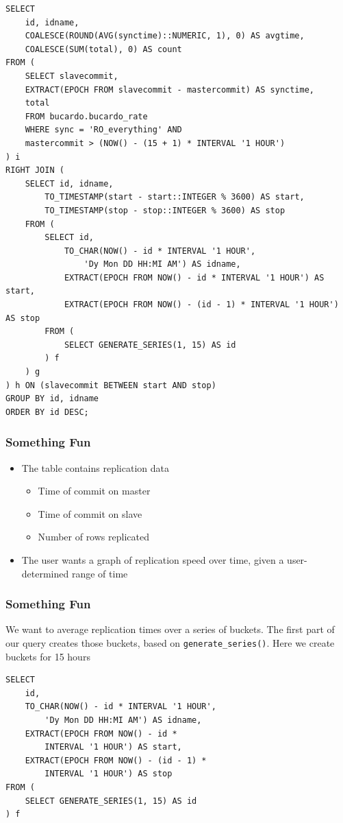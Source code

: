 \documentclass{beamer}
\begin{document}
\begin{frame}[fragile]
    \tiny
    \begin{verbatim}
SELECT
    id, idname,
    COALESCE(ROUND(AVG(synctime)::NUMERIC, 1), 0) AS avgtime,
    COALESCE(SUM(total), 0) AS count
FROM (
    SELECT slavecommit,
    EXTRACT(EPOCH FROM slavecommit - mastercommit) AS synctime,
    total
    FROM bucardo.bucardo_rate
    WHERE sync = 'RO_everything' AND
    mastercommit > (NOW() - (15 + 1) * INTERVAL '1 HOUR')
) i
RIGHT JOIN (
    SELECT id, idname,
        TO_TIMESTAMP(start - start::INTEGER % 3600) AS start,
        TO_TIMESTAMP(stop - stop::INTEGER % 3600) AS stop
    FROM (
        SELECT id,
            TO_CHAR(NOW() - id * INTERVAL '1 HOUR', 
                'Dy Mon DD HH:MI AM') AS idname,
            EXTRACT(EPOCH FROM NOW() - id * INTERVAL '1 HOUR') AS start,
            EXTRACT(EPOCH FROM NOW() - (id - 1) * INTERVAL '1 HOUR') AS stop
        FROM (
            SELECT GENERATE_SERIES(1, 15) AS id
        ) f
    ) g
) h ON (slavecommit BETWEEN start AND stop)
GROUP BY id, idname
ORDER BY id DESC;
    \end{verbatim}
\end{frame}

\begin{frame}
    \frametitle{Something Fun}
    \begin{itemize}
        \item The table contains replication data
        \pause
        \begin{itemize}
            \item Time of commit on master
            \pause
            \item Time of commit on slave
            \pause
            \item Number of rows replicated
            \pause
        \end{itemize}
        \item The user wants a graph of replication speed over time, given a user-determined range of time
    \end{itemize}
\end{frame}

\begin{frame}[fragile]
    \frametitle{Something Fun}
    We want to average replication times over a series of buckets. The first
    part of our query creates those buckets, based on
    \texttt{generate\_series()}. Here we create buckets for 15 hours
    \begin{verbatim}
SELECT 
    id,
    TO_CHAR(NOW() - id * INTERVAL '1 HOUR',
        'Dy Mon DD HH:MI AM') AS idname,
    EXTRACT(EPOCH FROM NOW() - id *
        INTERVAL '1 HOUR') AS start,
    EXTRACT(EPOCH FROM NOW() - (id - 1) *
        INTERVAL '1 HOUR') AS stop
FROM (
    SELECT GENERATE_SERIES(1, 15) AS id
) f
    \end{verbatim}
\end{frame}
\end{document}
